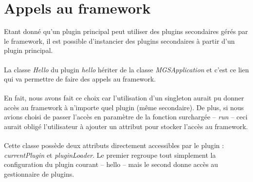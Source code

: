 \documentclass[12pt,a4paper]{article}
\begin{document}
\section{Appels au framework}
Etant donné qu'un plugin principal peut utiliser des plugins secondaires gérés 
par le framework, il est possible d'instancier des plugins secondaires à 
partir d'un plugin principal.
\\\\
La classe \emph{Hello} du plugin \emph{hello} hériter de la classe 
\emph{MGSApplication} et c'est ce lien qui va permettre de faire des appels au 
framework. 
\\\\
En fait, nous avons fait ce choix car l'utilisation d'un singleton aurait pu 
donner accès au framework à n'importe quel plugin (même secondaire). De plus, si 
nous avions choisi de passer l'accès en paramètre de la fonction surchargée -- 
\emph{run} -- ceci aurait obligé l'utilisateur à ajouter un attribut pour stocker 
l'accès au framework.
\\\\
Cette classe possède deux attributs directement accessibles par le plugin :
\emph{currentPlugin} et \emph{pluginLoader}. Le premier regroupe tout simplement 
la configuration du plugin courant -- hello -- mais le second donne accès au 
gestionnaire de plugins.
\end{document}
